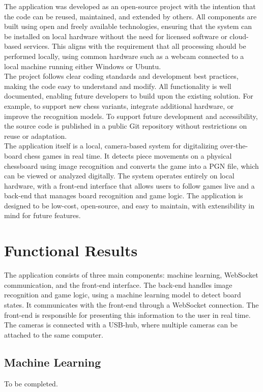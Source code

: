 The application was developed as an open-source project with the intention that the code can be reused, maintained, and extended by others. All components are built using open and freely available technologies, ensuring that the system can be installed on local hardware without the need for licensed software or cloud-based services. This aligns with the requirement that all processing should be performed locally, using common hardware such as a webcam connected to a local machine running either Windows or Ubuntu. \\

The project follows clear coding standards and development best practices, making the code easy to understand and modify. All functionality is well documented, enabling future developers to build upon the existing solution. For example, to support new chess variants, integrate additional hardware, or improve the recognition models. To support future development and accessibility, the source code is published in a public Git repository without restrictions on reuse or adaptation. \\

The application itself is a local, camera-based system for digitalizing over-the-board chess games in real time. It detects piece movements on a physical chessboard using image recognition and converts the game into a PGN file, which can be viewed or analyzed digitally. The system operates entirely on local hardware, with a front-end interface that allows users to follow games live and a back-end that manages board recognition and game logic. The application is designed to be low-cost, open-source, and easy to maintain, with extensibility in mind for future features.

\section{Functional Results}
The application consists of three main components: machine learning, WebSocket communication, and the front-end interface. The back-end handles image recognition and game logic, using a machine learning model to detect board states. It communicates with the front-end through a WebSocket connection. The front-end is responsible for presenting this information to the user in real time. The cameras is connected with a USB-hub, where multiple cameras can be attached to the same computer. 

\subsection{Machine Learning}
To be completed.

